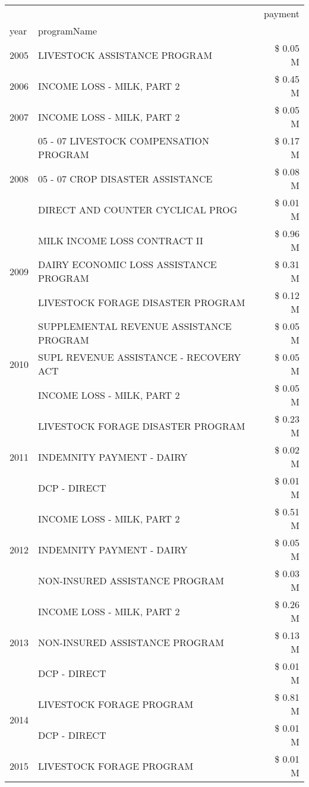 \begin{tabular}{llr}
\toprule
 &  & payment \\
year & programName &  \\
\midrule
2005 & LIVESTOCK ASSISTANCE PROGRAM & \$ 0.05 M \\
\cline{1-3}
2006 & INCOME LOSS - MILK, PART 2 & \$ 0.45 M \\
\cline{1-3}
2007 & INCOME LOSS - MILK, PART 2 & \$ 0.05 M \\
\cline{1-3}
\multirow[t]{3}{*}{2008} & 05 - 07 LIVESTOCK COMPENSATION PROGRAM & \$ 0.17 M \\
 & 05 - 07 CROP DISASTER ASSISTANCE & \$ 0.08 M \\
 & DIRECT AND COUNTER CYCLICAL PROG & \$ 0.01 M \\
\cline{1-3}
\multirow[t]{3}{*}{2009} & MILK INCOME LOSS CONTRACT II & \$ 0.96 M \\
 & DAIRY ECONOMIC LOSS ASSISTANCE PROGRAM & \$ 0.31 M \\
 & LIVESTOCK FORAGE DISASTER  PROGRAM & \$ 0.12 M \\
\cline{1-3}
\multirow[t]{3}{*}{2010} & SUPPLEMENTAL REVENUE ASSISTANCE PROGRAM & \$ 0.05 M \\
 & SUPL REVENUE ASSISTANCE - RECOVERY ACT & \$ 0.05 M \\
 & INCOME LOSS - MILK, PART 2 & \$ 0.05 M \\
\cline{1-3}
\multirow[t]{3}{*}{2011} & LIVESTOCK FORAGE DISASTER PROGRAM & \$ 0.23 M \\
 & INDEMNITY PAYMENT - DAIRY & \$ 0.02 M \\
 & DCP - DIRECT & \$ 0.01 M \\
\cline{1-3}
\multirow[t]{3}{*}{2012} & INCOME LOSS - MILK, PART 2 & \$ 0.51 M \\
 & INDEMNITY PAYMENT - DAIRY & \$ 0.05 M \\
 & NON-INSURED ASSISTANCE PROGRAM & \$ 0.03 M \\
\cline{1-3}
\multirow[t]{3}{*}{2013} & INCOME LOSS - MILK, PART 2 & \$ 0.26 M \\
 & NON-INSURED ASSISTANCE PROGRAM & \$ 0.13 M \\
 & DCP - DIRECT & \$ 0.01 M \\
\cline{1-3}
\multirow[t]{2}{*}{2014} & LIVESTOCK FORAGE PROGRAM & \$ 0.81 M \\
 & DCP - DIRECT & \$ 0.01 M \\
\cline{1-3}
\multirow[t]{3}{*}{2015} & LIVESTOCK FORAGE PROGRAM & \$ 0.01 M \\

\end{tabular}
